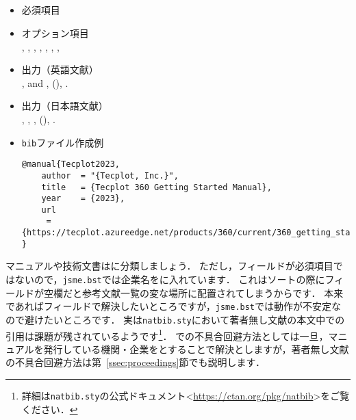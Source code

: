 \documentclass[a4paper,fleqn,uplatex,dvipdfmx]{jsarticle}
\newcommand{\jsmefile}{\texttt{jsme.bst}}
\begin{document}
\subsection{\ttmanual}
\label{ssec:manual}
\begin{screen}
    \begin{itemize}
        \item 必須項目 \\
        \tttitle
        \item オプション項目 \\
        \ttauthor, \ttorganization, \ttaddress, \ttedition, \ttmonth, \ttyear, \ttnote, \ttkey
        \item 出力（英語文献） \\
            \colorbox[gray]{0.8}{\ttauthorf}, \colorbox[gray]{0.8}{\ttauthors} and \colorbox[gray]{0.8}{\ttauthort}, \colorbox[gray]{0.8}{\tttitle} (\colorbox[gray]{0.8}{\ttyear}), \colorbox[gray]{0.8}{\ttnote}.
        \item 出力（日本語文献） \\
            \colorbox[gray]{0.8}{\ttauthorf}, \colorbox[gray]{0.8}{\ttauthors}, \colorbox[gray]{0.8}{\ttauthort}, \colorbox[gray]{0.8}{\tttitle} (\colorbox[gray]{0.8}{\ttyear}), \colorbox[gray]{0.8}{\ttnote}.
        \item \verb|bib|ファイル作成例 \vspace{-3mm}
\begin{verbatim}
@manual{Tecplot2023,
    author  = "{Tecplot, Inc.}",
    title   = {Tecplot 360 Getting Started Manual},
    year    = {2023},
    url    
     = {https://tecplot.azureedge.net/products/360/current/360_getting_started.pdf}
}
\end{verbatim}
    \end{itemize}
\end{screen}

マニュアルや技術文書は\ttmanual に分類しましょう．
ただし，\ttauthor フィールドが必須項目ではないので，\jsmefile では企業名を\ttauthor に入れています．
これはソートの際に\ttauthor フィールドが空欄だと参考文献一覧の変な場所に配置されてしまうからです．
本来であれば\ttkey フィールドで解決したいところですが，\jsmefile では動作が不安定なので避けたいところです．
実は\verb|natbib.sty|において著者無し文献の本文中での引用は課題が残されているようです\footnote{詳細は\texttt{natbib.sty}の公式ドキュメント\textless\url{https://ctan.org/pkg/natbib}\textgreater をご覧ください．}．
\ttmanual での不具合回避方法としては一旦，マニュアルを発行している機関・企業を\ttauthor とすることで解決としますが，著者無し文献の不具合回避方法は第~\ref{ssec:proceedings}節\ttproceedings でも説明します．
\end{document}
